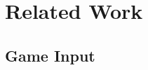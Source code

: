 \documentclass{sigchi}
\begin{document}









\section{Related Work}

    \subsection{Game Input}
 
\end{document}

